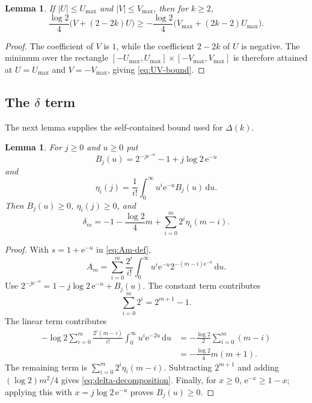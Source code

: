 \documentclass[11pt]{amsart}
\theoremstyle{plain}
\newtheorem{lemma}[theorem]{Lemma}
\theoremstyle{definition}
\newcommand{\e}{\mathrm e}
\newcommand{\dd}{\,\mathrm d}
\newcommand{\abs}[1]{\lvert #1\rvert}
\begin{document}
\begin{lemma}\label{lem:UV-bound}
If $\abs U\leq U_{\max}$ and $\abs V\leq V_{\max}$, then for $k\geq2$,
\begin{equation}\label{eq:UV-bound}
 \frac{\log2}{4}\bigl(V+(2-2k)U\bigr)
 \geq-\frac{\log2}{4}\bigl(V_{\max}+(2k-2)U_{\max}\bigr).
\end{equation}
\end{lemma}

\begin{proof}
The coefficient of $V$ is $1$, while the coefficient $2-2k$ of $U$ is
negative. The minimum over the rectangle
$[-U_{\max},U_{\max}]\times[-V_{\max},V_{\max}]$ is therefore attained at
$U=U_{\max}$ and $V=-V_{\max}$, giving \eqref{eq:UV-bound}.
\end{proof}

\subsection{The $\delta$ term}

The next lemma supplies the self-contained bound used for $\Delta(k)$.

\begin{lemma}\label{lem:delta-decomposition}
For $j\geq0$ and $u\geq0$ put
\[
 B_j(u)=2^{-j\e^{-u}}-1+j\log2\,\e^{-u}
\]
and
\[
 \eta_i(j)=\frac1{i!}\int_0^\infty u^i\e^{-u}B_j(u)\dd u.
\]
Then $B_j(u)\geq0$, $\eta_i(j)\geq0$, and
\begin{equation}\label{eq:delta-decomposition}
 \delta_m=-1-\frac{\log2}{4}m+
          \sum_{i=0}^m2^i\eta_i(m-i).
\end{equation}
\end{lemma}

\begin{proof}
With $s=1+\e^{-u}$ in \eqref{eq:Am-def},
\[
 A_m=\sum_{i=0}^m\frac{2^i}{i!}
       \int_0^\infty u^i\e^{-u}2^{-(m-i)\e^{-u}}\dd u.
\]
Use
$2^{-j\e^{-u}}=1-j\log2\,\e^{-u}+B_j(u)$. The constant term contributes
\[
 \sum_{i=0}^m2^i=2^{m+1}-1.
\]
The linear term contributes
\begin{align*}
 -\log2\sum_{i=0}^m\frac{2^i(m-i)}{i!}
  \int_0^\infty u^i\e^{-2u}\dd u
 &=-\frac{\log2}{2}\sum_{i=0}^m(m-i)\\
 &=-\frac{\log2}{4}m(m+1).
\end{align*}
The remaining term is $\sum_{i=0}^m2^i\eta_i(m-i)$. Subtracting
$2^{m+1}$ and adding $(\log2)m^2/4$ gives
\eqref{eq:delta-decomposition}. Finally, for $x\geq0$,
$\e^{-x}\geq1-x$; applying this with $x=j\log2\,\e^{-u}$ proves
$B_j(u)\geq0$.
\end{proof}
\end{document}
